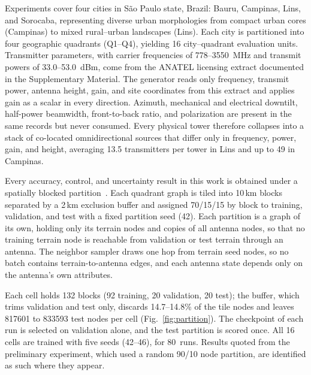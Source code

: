 \documentclass{ieeeaccess}
\begin{document}
Experiments cover four cities in S\~{a}o Paulo state, Brazil: Bauru, Campinas, Lins, and Sorocaba, representing diverse urban morphologies from compact urban cores (Campinas) to mixed rural--urban landscapes (Lins). Each city is partitioned into four geographic quadrants (Q1--Q4), yielding 16 city--quadrant evaluation units. Transmitter parameters, with carrier frequencies of 778--3550~MHz and transmit powers of 33.0--53.0~dBm, come from the ANATEL licensing extract documented in the Supplementary Material. The generator reads only frequency, transmit power, antenna height, gain, and site coordinates from this extract and applies gain as a scalar in every direction. Azimuth, mechanical and electrical downtilt, half-power beamwidth, front-to-back ratio, and polarization are present in the same records but never consumed. Every physical tower therefore collapses into a stack of co-located omnidirectional sources that differ only in frequency, power, gain, and height, averaging 13.5 transmitters per tower in Lins and up to 49 in Campinas.

Every accuracy, control, and uncertainty result in this work is obtained under a spatially blocked partition~\cite{roberts2017cross}. Each quadrant graph is tiled into 10\,km blocks separated by a 2\,km exclusion buffer and assigned 70/15/15 by block to training, validation, and test with a fixed partition seed (42). Each partition is a graph of its own, holding only its terrain nodes and copies of all antenna nodes, so that no training terrain node is reachable from validation or test terrain through an antenna. The neighbor sampler draws one hop from terrain seed nodes, so no batch contains terrain-to-antenna edges, and each antenna state depends only on the antenna's own attributes.

Each cell holds 132 blocks (92 training, 20 validation, 20 test); the buffer, which trims validation and test only, discards 14.7--14.8\% of the tile nodes and leaves \num{817601} to \num{833593} test nodes per cell (Fig.~\ref{fig:partition}). The checkpoint of each run is selected on validation alone, and the test partition is scored once. All 16 cells are trained with five seeds (42--46), for 80~runs. Results quoted from the preliminary experiment, which used a random 90/10 node partition, are identified as such where they appear.


\end{document}
